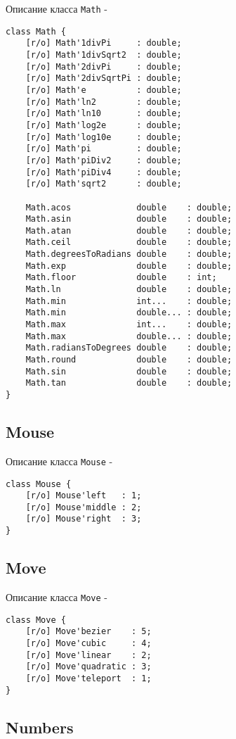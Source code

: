 \noindent Описание класса \texttt{Math} -
\begin{verbatim}
class Math {
    [r/o] Math'1divPi     : double;
	[r/o] Math'1divSqrt2  : double;
	[r/o] Math'2divPi     : double;
	[r/o] Math'2divSqrtPi : double;
	[r/o] Math'e          : double;
	[r/o] Math'ln2        : double;
	[r/o] Math'ln10       : double;
	[r/o] Math'log2e      : double;
	[r/o] Math'log10e     : double;
	[r/o] Math'pi         : double;
	[r/o] Math'piDiv2     : double;
	[r/o] Math'piDiv4     : double;
	[r/o] Math'sqrt2      : double;
	
    Math.acos             double    : double;
	Math.asin             double    : double;
	Math.atan             double    : double;
	Math.ceil             double    : double;
	Math.degreesToRadians double    : double;
	Math.exp              double    : double;
	Math.floor            double    : int;
	Math.ln               double    : double;
	Math.min              int...    : double;
	Math.min              double... : double;
	Math.max              int...    : double;
	Math.max              double... : double;
	Math.radiansToDegrees double    : double;
	Math.round            double    : double;
	Math.sin              double    : double;
	Math.tan              double    : double;
}
\end{verbatim}

\subsection{{\color{orange} Mouse}}

\noindent Описание класса \texttt{Mouse} -
\begin{verbatim}
class Mouse {
    [r/o] Mouse'left   : 1;
	[r/o] Mouse'middle : 2;
	[r/o] Mouse'right  : 3;
}
\end{verbatim}

\subsection{{\color{orange} Move}}

\noindent Описание класса \texttt{Move} -
\begin{verbatim}
class Move {
    [r/o] Move'bezier    : 5;
	[r/o] Move'cubic     : 4;
	[r/o] Move'linear    : 2;
	[r/o] Move'quadratic : 3;
	[r/o] Move'teleport  : 1;
}
\end{verbatim}

\subsection{{\color{orange} Numbers}}

